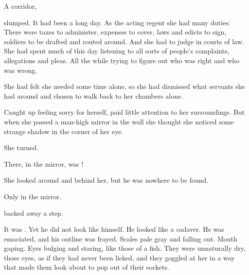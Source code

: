 \begin{comment}
\subsection{\Tiroco{} in the corridor}
\end{comment}
\stamp
  {\dateIcorHauntsTiroco}
  {A corridor, \CastlePelidor}


\Tiroco{} slumped. 
It had been a long day. 
As the acting regent she had many duties: 
There were taxes to administer, expenses to cover, laws and edicts to sign, soldiers to be drafted and routed around. 
And she had to judge in courts of law. 
She had spent much of this day listening to all sorts of people's complaints, allegations and pleas. 
All the while trying to figure out who was right and who was wrong. 


She had felt she needed some time alone, so she had dismissed what servants she had around and chosen to walk back to her chambers alone. 

Caught up feeling sorry for herself, \Tiroco{} paid little attention to her surroundings. 
But when she passed a man-high mirror in the wall she thought she noticed some strange shadow in the corner of her eye. 

She turned. 

There, in the mirror, was \Icor!

She looked around and behind her, but he was nowhere to be found. 

Only in the mirror. 

\Tiroco{} backed away a step. 

It was \Icor. 
Yet he did not look like himself. 
He looked like a cadaver. 
He was emaciated, and his outline was frayed. 
Scales pale gray and falling out. 
Mouth gaping. 
Eyes bulging and staring, like those of a fish. 
They were unnaturally dry, those eyes, as if they had never been licked, and they goggled at her in a way that made them look about to pop out of their sockets. 

